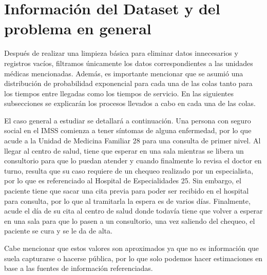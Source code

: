 \documentclass[10pt]{article}
\begin{document}
    \section{Información del Dataset y del problema en general}
    Después de realizar una limpieza básica para eliminar datos innecesarios y registros vacíos, filtramos únicamente los datos correspondientes a las unidades médicas mencionadas. Además, es importante mencionar que se asumió una distribución de probabilidad exponencial para cada una de las colas tanto para los tiempos entre llegadas como los tiempos de servicio. En las siguientes subsecciones se explicarán los procesos llevados a cabo en cada una de las colas. \par
    El caso general a estudiar se detallará a continuación. Una persona con seguro social en el IMSS comienza a tener síntomas de alguna enfermedad, por lo que acude a la Unidad de Medicina Familiar 28 para una consulta de primer nivel. Al llegar al centro de salud, tiene que esperar en una sala mientras se libera un consultorio para que lo puedan atender y cuando finalmente lo revisa el doctor en turno, resulta que su caso requiere de un chequeo realizado por un especialista, por lo que es referenciado al Hospital de Especialidades 25. Sin embargo, el paciente tiene que sacar una cita previa para poder ser recibido en el hospital para consulta, por lo que al tramitarla la espera es de varios días. Finalmente, acude el día de su cita al centro de salud donde todavía tiene que volver a esperar en una sala para que lo pasen a un consultorio, una vez saliendo del chequeo, el paciente se cura y se le da de alta. \par
    Cabe mencionar que estos valores son aproximados ya que no es información que suela capturarse o hacerse pública, por lo que solo podemos hacer estimaciones en base a las fuentes de información referenciadas. \par
    
\end{document}
